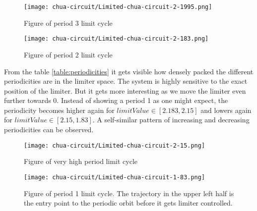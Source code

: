 \documentclass[main]{subfiles}
\begin{document}
{\hspace*{-0.2\textwidth}
\begin{minipage}{1.3\textwidth}
\begin{figure}[H]
\centering
\texttt{[image: chua-circuit/Limited-chua-circuit-2-1995.png]}
\caption[Figure of period 3 limit cycle]{Figure of period 3 limit cycle}
\label{figure:chaotictrajectories}
\end{figure}
\end{minipage}

\hspace*{-0.2\textwidth}
\begin{minipage}{1.3\textwidth}
\begin{figure}[H]
\centering
\texttt{[image: chua-circuit/Limited-chua-circuit-2-183.png]}
\caption[Figure of period 3 limit cycle]{Figure of period 2 limit cycle}
\label{figure:chaotictrajectories}
\end{figure}
\end{minipage}

From the table \ref{table:periodicities} it gets visible how densely packed the different periodicities are in the limiter space. The system is highly sensitive to the exact position of the limiter. But it gets more interesting as we move the limiter even further towards 0. Instead of showing a period 1 as one might expect, the periodicity becomes higher again for \(limitValue \in [2.183,2.15]\) and lowers again for \(limitValue \in [2.15,1.83]\). A self-similar pattern of increasing and decreasing periodicities can be observed.

\hspace*{-0.2\textwidth}
\begin{minipage}{1.3\textwidth}
\begin{figure}[H]
\centering
\texttt{[image: chua-circuit/Limited-chua-circuit-2-15.png]}
\caption[Figure of period 3 limit cycle]{Figure of very high period limit cycle}
\label{figure:chaotictrajectories}
\end{figure}
\end{minipage}

\hspace*{-0.2\textwidth}
\begin{minipage}{1.3\textwidth}
\begin{figure}[H]
\centering
\texttt{[image: chua-circuit/Limited-chua-circuit-1-83.png]}
\caption[Figure of period 3 limit cycle]{Figure of period 1 limit cycle. The trajectory in the upper left half is the entry point to the periodic orbit before it gets limiter controlled.}
\label{figure:chaotictrajectories}
\end{figure}
\end{minipage}

}%
\end{document}
